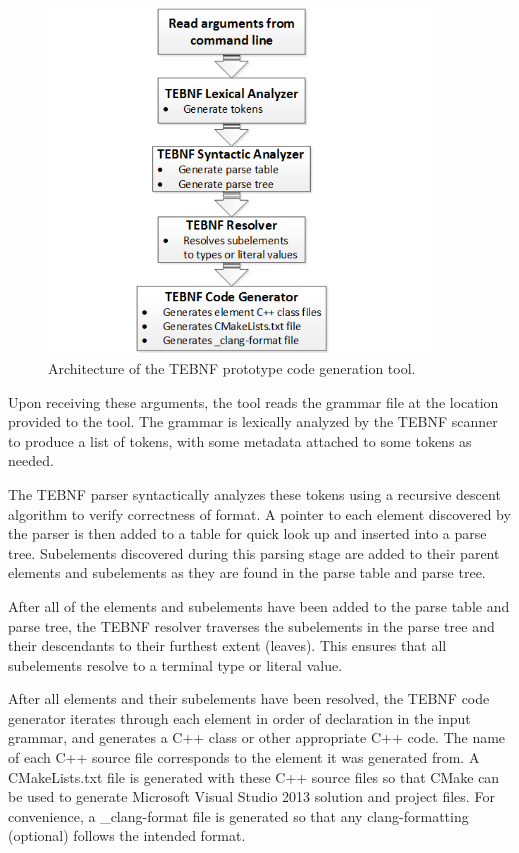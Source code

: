 \begin{figure}[h!]
\centering
\includegraphics[width=0.9\textwidth]{figures/TEBNFCodeGenToolArchitecture.png}
\caption{Architecture of the TEBNF prototype code generation tool.}
\label{fig:TEBNFCodeGenToolArchitecture}
\end{figure}

\indent
Upon receiving these arguments, the tool reads the grammar file at the location provided to the tool.  The grammar is lexically analyzed by the TEBNF scanner to produce a list of tokens, with some metadata attached to some tokens as needed.

\indent
The TEBNF parser syntactically analyzes these tokens using a recursive descent algorithm to verify correctness of format.  A pointer to each element discovered by the parser is then added to a table for quick look up and inserted into a parse tree.  Subelements discovered during this parsing stage are added to their parent elements and subelements as they are found in the parse table and parse tree.

\indent
After all of the elements and subelements have been added to the parse table and parse tree, the TEBNF resolver traverses the subelements in the parse tree and their descendants to their furthest extent (leaves).  This ensures that all subelements resolve to a terminal type or literal value.

\indent
After all elements and their subelements have been resolved, the TEBNF code generator iterates through each element in order of declaration in the input grammar, and generates a C++ class or other appropriate C++ code.  The name of each C++ source file corresponds to the element it was generated from.  A CMakeLists.txt file is generated with these C++ source files so that CMake can be used to generate Microsoft Visual Studio 2013 solution and project files.  For convenience, a \_clang-format file is generated so that any clang-formatting (optional) follows the intended format.

